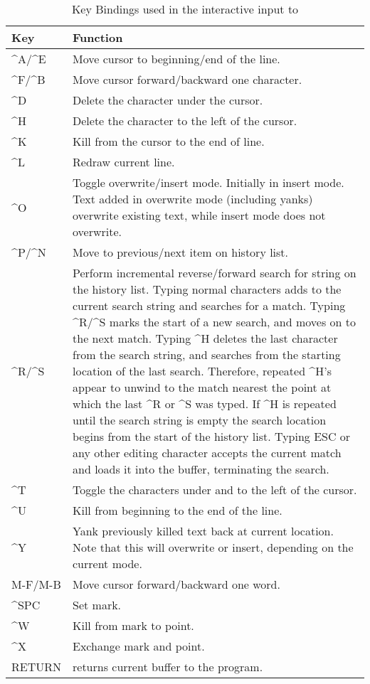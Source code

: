 \begin{longtable}{lp{4.0in}}
\caption{Key Bindings used in the interactive input to \aprepro{}} \\
\hline
Key & Function \\
\hline
\endhead
\^{}A/\^{}E & Move cursor to beginning/end of the line. \\
\^{}F/\^{}B & Move cursor forward/backward one character. \\
\^{}D       & Delete the character under the cursor. \\
\^{}H       & Delete the character to the left of the cursor. \\
\^{}K       & Kill from the cursor to the end of line. \\
\^{}L       & Redraw current line. \\
\^{}O       & Toggle overwrite/insert mode. Initially in insert mode. Text 
              added in overwrite mode (including yanks) overwrite 
              existing text, while insert mode does not overwrite. \\
\^{}P/\^{}N & Move to previous/next item on history list. \\
\^{}R/\^{}S & Perform incremental reverse/forward search for string on 
              the history list.  Typing normal characters adds to the current 
              search string and searches for a match. Typing \^{}R/\^{}S marks 
              the start of a new search, and moves on to the next match. 
              Typing \^{}H deletes the last character from the search 
              string, and searches from the starting location of the last search. 
              Therefore, repeated \^{}H's appear to unwind to the match nearest 
              the point at which the last \^{}R or \^{}S was typed.  If \^{}H is 
              repeated until the search string is empty the search location 
              begins from the start of the history list.  Typing ESC or 
              any other editing character accepts the current match and 
              loads it into the buffer, terminating the search.  \\
\^{}T       & Toggle the characters under and to the left of the cursor.  \\
\^{}U       & Kill from beginning to the end of the line. \\
\^{}Y       & Yank previously killed text back at current location.  Note that 
              this will overwrite or insert, depending on the current mode. \\
M-F/M-B     & Move cursor forward/backward one word. \\
\^{}SPC     & Set mark. \\
\^{}W       & Kill from mark to point. \\
\^{}X       & Exchange mark and point. \\
RETURN      & returns current buffer to the program.
\end{longtable}
